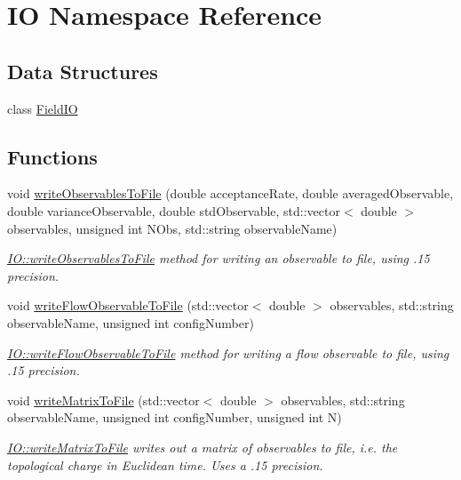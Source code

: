 \hypertarget{namespace_i_o}{}\section{IO Namespace Reference}
\label{namespace_i_o}
\subsection*{Data Structures}
\begin{DoxyCompactItemize}
\item 
class \mbox{\hyperlink{class_i_o_1_1_field_i_o}{Field\+IO}}
\end{DoxyCompactItemize}
\subsection*{Functions}
\begin{DoxyCompactItemize}
\item 
void \mbox{\hyperlink{namespace_i_o_ad8cf5aef8f60d10b80292b69a091d5ac}{write\+Observables\+To\+File}} (double acceptance\+Rate, double averaged\+Observable, double variance\+Observable, double std\+Observable, std\+::vector$<$ double $>$ observables, unsigned int N\+Obs, std\+::string observable\+Name)
\begin{DoxyCompactList}\small\item\em \mbox{\hyperlink{namespace_i_o_ad8cf5aef8f60d10b80292b69a091d5ac}{I\+O\+::write\+Observables\+To\+File}} method for writing an observable to file, using .15 precision. \end{DoxyCompactList}\item 
void \mbox{\hyperlink{namespace_i_o_a4f554804fd2ccd9c13c73777c5cbbf77}{write\+Flow\+Observable\+To\+File}} (std\+::vector$<$ double $>$ observables, std\+::string observable\+Name, unsigned int config\+Number)
\begin{DoxyCompactList}\small\item\em \mbox{\hyperlink{namespace_i_o_a4f554804fd2ccd9c13c73777c5cbbf77}{I\+O\+::write\+Flow\+Observable\+To\+File}} method for writing a flow observable to file, using .15 precision. \end{DoxyCompactList}\item 
void \mbox{\hyperlink{namespace_i_o_ad77b7dd770afc8e2eb433d6187ea3616}{write\+Matrix\+To\+File}} (std\+::vector$<$ double $>$ observables, std\+::string observable\+Name, unsigned int config\+Number, unsigned int N)
\begin{DoxyCompactList}\small\item\em \mbox{\hyperlink{namespace_i_o_ad77b7dd770afc8e2eb433d6187ea3616}{I\+O\+::write\+Matrix\+To\+File}} writes out a matrix of observables to file, i.\+e. the topological charge in Euclidean time. Uses a .15 precision. \end{DoxyCompactList}\end{DoxyCompactItemize}


